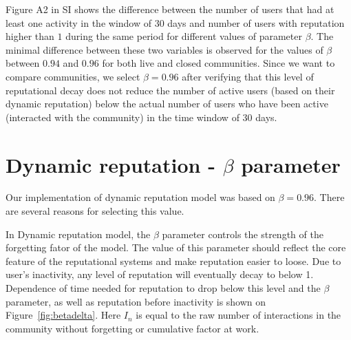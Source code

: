 Figure A2 in SI shows the difference between the number of users that had at least one activity in the window of 30 days and number of users with reputation higher than $1$ during the same period for different values of parameter $\beta$. The minimal difference between these two variables is observed for the values of $\beta$ between $0.94$ and $0.96$ for both live and closed communities. Since we want to compare communities, we select $\beta = 0.96$ after verifying that this level of reputational decay does not reduce the number of active users (based on their dynamic reputation) below the actual number of users who have been active (interacted with the community) in the time window of 30 days. 



\section{Dynamic reputation - $\beta$ parameter}

Our implementation of dynamic reputation model was based on $\beta = 0.96$. There are several reasons for selecting this value.

In Dynamic reputation model, the $\beta$ parameter controls the strength of the forgetting fator of the model.  The value of this parameter should reflect the core feature of the reputational systems and make reputation easier to loose. Due to user's inactivity, any level of reputation will eventually decay to below 1. Dependence of time needed for reputation to drop below this level and the $\beta$ parameter, as well as reputation before inactivity is shown on Figure~\ref{fig:betadelta}. Here $I_n$ is equal to the raw number of interactions in the community without forgetting or cumulative factor at work.

